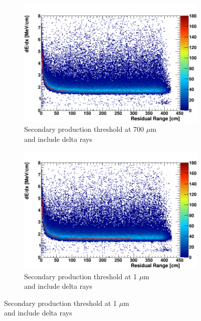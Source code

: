 \begin{figure}[t!]
        \begin{subfigure}[b]{0.495\textwidth}   
            \centering 
            \includegraphics[width=\textwidth]{derr_mu_delta_700um}
            \caption{Secondary production threshold at 700 $\mu$m \\ and include delta rays}%
            \label{fig:derr_mu_delta_700}
        \end{subfigure}
        \hfill
        \begin{subfigure}[b]{0.495\textwidth}   
            \centering 
            \includegraphics[width=\textwidth]{derr_mu_delta_1um}
            \caption{Secondary production threshold at 1 $\mu$m \\ and include delta rays}%
            \label{fig:derr_mu_delta_1}
        \end{subfigure}

\end{figure}
